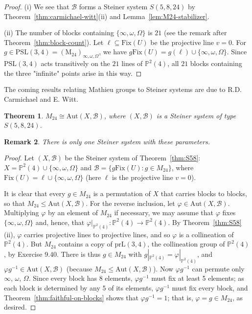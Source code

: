 \documentclass[12pt,a4paper,openany]{book}
\newtheorem{theorem}{Theorem}[section]
\newcommand{\PSL}{\mathrm{PSL}}
\newcommand{\Aut}{\mathrm{Aut}}
\newcommand{\Mtwentyfour}{M_{24}}
\newcommand{\Fix}{\mathrm{Fix}}
\newcommand{\prL}{\mathrm{prL}}
\renewcommand{\PSL}{\mathrm{PSL}}
\renewcommand{\PSL}{\mathrm{PSL}}
\newcommand{\PP}{\mathbb{P}}
\newtheorem{remark}[theorem]{Remark}
\begin{document}
\begin{proof}
(i) We see that $\mathscr{B}$ forms a Steiner system $S(5,8,24)$ by Theorem~\ref{thm:carmichael-witt}(ii) and Lemma~\ref{lem:M24-stabilizer}.

(ii) The number of blocks containing $\{\infty, \omega, \Omega\}$ is $21$ (see the remark after Theorem~\ref{thm:block-count}). Let $\ell \subseteq \Fix(U)$ be the projective line $v=0$. For $g \in \PSL(3,4) = (\mathrm{M}_{24})_{\infty,\omega,\Omega}$, we have $g \Fix(U) = g(\ell) \cup \{\infty, \omega, \Omega\}$. Since $\PSL(3,4)$ acts transitively on the $21$ lines of $\PP^2(4)$, all $21$ blocks containing the three "infinite" points arise in this way.
\end{proof}

The coming results relating Mathieu groups to Steiner systems are due to R.D. Carmichael and E. Witt.

\begin{theorem}\label{thm:M24-aut}
$\Mtwentyfour \cong \Aut(X, \mathscr{B})$, where $(X, \mathscr{B})$ is a Steiner system of type $S(5, 8, 24)$.
\end{theorem}
\begin{remark}
There is only one Steiner system with these parameters.
\end{remark}
\begin{proof}
Let $(X, \mathscr{B})$ be the Steiner system of Theorem~\ref{thm:S58}: $X = \PP^2(4) \cup \{\infty, \omega, \Omega\}$ and $\mathscr{B} = \{g\Fix(U): g \in \Mtwentyfour\}$, where $\Fix(U) = \ell \cup \{\infty, \omega, \Omega\}$ (here $\ell$ is the projective line $v = 0$).

It is clear that every $g \in \Mtwentyfour$ is a permutation of $X$ that carries blocks to blocks, so that $\Mtwentyfour \leq \Aut(X, \mathscr{B})$. For the reverse inclusion, let $\varphi \in \Aut(X, \mathscr{B})$. Multiplying $\varphi$ by an element of $\Mtwentyfour$ if necessary, we may assume that $\varphi$ fixes $\{\infty, \omega, \Omega\}$ and, hence, that $\varphi|_{\PP^2(4)}: \PP^2(4) \to \PP^2(4)$. By Theorem~\ref{thm:S58}(ii), $\varphi$ carries projective lines to projective lines, and so $\varphi$ is a collineation of $\PP^2(4)$. But $\Mtwentyfour$ contains a copy of $\prL(3,4)$, the collineation group of $\PP^2(4)$, by Exercise 9.40. There is thus $g \in \Mtwentyfour$ with $g|_{\PP^2(4)} = \varphi|_{\PP^2(4)}$, and $\varphi g^{-1} \in \Aut(X, \mathscr{B})$ (because $\Mtwentyfour \leq \Aut(X, \mathscr{B})$). Now $\varphi g^{-1}$ can permute only $\infty$, $\omega$, $\Omega$. Since every block has 8 elements, $\varphi g^{-1}$ must fix at least 5 elements; as each block is determined by any 5 of its elements, $\varphi g^{-1}$ must fix every block, and Theorem~\ref{thm:faithful-on-blocks} shows that $\varphi g^{-1} = 1$; that is, $\varphi = g \in \Mtwentyfour$, as desired.
\end{proof}
\end{document}
